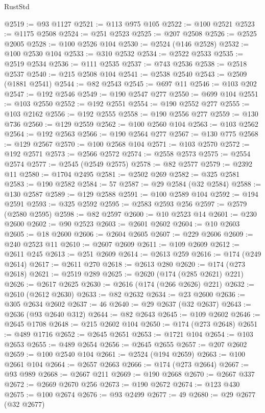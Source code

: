 \begin{lexlean}{RustStd}
\begin{coremodule}
@2519 := @93 @1127
@2521 := @113 @975 @105
@2522 := @100 @2521
@2523 := @1175 @2508
@2524 := @251 @2523
@2525 := @207 @2508
@2526 := @2525 @2005
@2528 := @100 @2526 @104
@2530 := @2524 (@146 @2528)
@2532 := @100 @2530 @104
@2533 := @310 @2532
@2534 := @2522 @2533
@2535 := @2519 @2534
@2536 := @111 @2535
@2537 := @743 @2536
@2538 := @2518 @2537
@2540 := @215 @2508 @104
@2541 := @2538 @2540
@2543 := @2509 (@1881 @2541)
@2544 := @82 @2543
@2545 := @697 @11
@2546 := @103 @202
@2547 := @192 @2546
@2549 := @190 @2547 @277
@2550 := @699 @104
@2551 := @103 @2550
@2552 := @192 @2551
@2554 := @190 @2552 @277
@2555 := @103 @2162
@2556 := @192 @2555
@2558 := @190 @2556 @277
@2559 := @130 @736
@2560 := @129 @2559
@2562 := @100 @2560 @104
@2563 := @103 @2562
@2564 := @192 @2563
@2566 := @190 @2564 @277
@2567 := @130 @775
@2568 := @129 @2567
@2570 := @100 @2568 @104
@2571 := @103 @2570
@2572 := @192 @2571
@2573 := @2566 @2572
@2574 := @2558 @2573
@2575 := @2554 @2574
@2577 := @2545 (@2549 @2575)
@2578 := @82 @2577
@2579 := @2392 @11
@2580 := @1704 @2495
@2581 := @2502 @269
@2582 := @325 @2581
@2583 := @190 @2582
@2584 := 57
@2587 := @29 @2584 (@32 @2584)
@2588 := @130 @2587
@2589 := @129 @2588
@2591 := @100 @2589 @104
@2592 := @194 @2591
@2593 := @325 @2592
@2595 := @2583 @2593 @256
@2597 := @2579 (@2580 @2595)
@2598 := @82 @2597
@2600 := @10 @2523 @14
@2601 := @230 @2600
@2602 := @90 @2523
@2603 := @2601 @2602
@2604 := @10 @2603
@2605 := @18 @2600
@2606 := @2604 @2605
@2607 := @229 @2606
@2609 := @240 @2523 @11
@2610 := @2607 @2609
@2611 := @109 @2609
@2612 := @2611 @245
@2613 := @251 @2609
@2614 := @2613 @259
@2616 := @174 (@249 @2614)
@2617 := @2611 @270
@2618 := @2613 @280
@2620 := @174 (@273 @2618)
@2621 := @2519 @289
@2625 := @2620 (@174 (@285 @2621) @221)
@2626 := @2617 @2625
@2630 := @2616 (@174 (@266 @2626) @221)
@2632 := @2610 (@2612 @2630)
@2633 := @82 @2632
@2634 := @23 @2600
@2636 := @305 @2634 @2602
@2637 := 46
@2640 := @29 @2637 (@32 @2637)
@2643 := @2636 (@93 @2640 @312)
@2644 := @82 @2643
@2645 := @109 @2602
@2646 := @2645 @1708
@2648 := @215 @2602 @104
@2650 := @174 (@273 @2648)
@2651 := @489 @1716
@2652 := @2645 @2651
@2653 := @1721 @104
@2654 := @103 @2653
@2655 := @489 @2654
@2656 := @2645 @2655
@2657 := @207 @2602
@2659 := @100 @2540 @104
@2661 := @2524 (@194 @2659)
@2663 := @100 @2661 @104
@2664 := @2657 @2663
@2666 := @174 (@273 @2664)
@2667 := @93 @989
@2668 := @2667 @211
@2669 := @190 @2668
@2670 := @2667 @337
@2672 := @2669 @2670 @256
@2673 := @190 @2672
@2674 := @123 @430
@2675 := @100 @2674
@2676 := @93 @2499
@2677 := 49
@2680 := @29 @2677 (@32 @2677)

\end{coremodule}
\end{lexlean}
